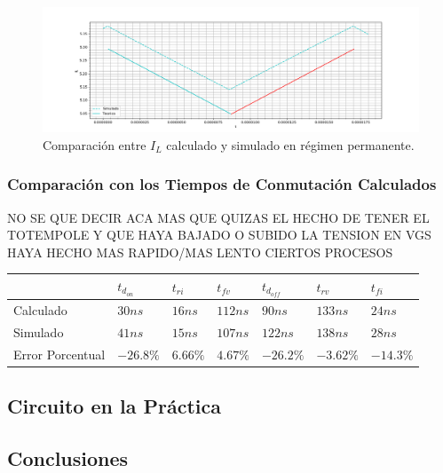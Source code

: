 \begin{figure}[H]
	\centering
	\includegraphics[width=0.8\linewidth]{ImagenesEjercicio-1/il_permanente_sim}
	\caption{Comparación entre $I_L$ calculado y simulado en régimen permanente.}
	\label{ej1:fig:il_permanente_sum}
\end{figure}

\subsubsection{Comparación con los Tiempos de Conmutación Calculados}

NO SE QUE DECIR ACA MAS QUE QUIZAS EL HECHO DE TENER EL TOTEMPOLE Y QUE HAYA BAJADO O SUBIDO LA TENSION EN VGS HAYA HECHO MAS RAPIDO/MAS LENTO CIERTOS PROCESOS

\begin{table}[H]
\centering
\begin{tabular}{@{}lllllll@{}}
\toprule
 & $t_{d_{on}}$ & $t_{ri}$ & $t_{fv}$ & $t_{d_{off}}$ & $t_{rv}$ & $t_{fi}$ \\ \midrule
Calculado & $30ns$ & $16ns$ & $112ns$ & $90ns$ & $133ns$ & $24ns$ \\
Simulado & $41ns$ & $15ns$ & $107ns$ & $122ns$ & $138ns$ & $28ns$ \\
Error Porcentual & $-26.8\%$ & $6.66\%$ & $4.67\%$ & $-26.2\%$ & $-3.62\%$ & $-14.3\%$ \\ \bottomrule
\end{tabular}
\end{table}

\subsection{Circuito en la Práctica}

\subsection{Conclusiones}



